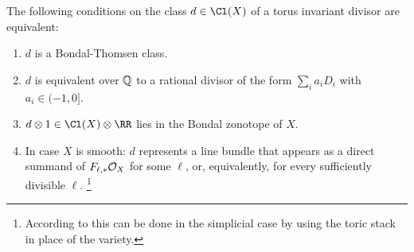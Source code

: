 \documentclass{amsart}
\begin{document}
\begin{thm}\label{thm:Bondal-Thomsen equivalences}
    The following conditions on the class $d\in \Cl(X)$ of a torus invariant divisor  are equivalent:
    \begin{enumerate}
        \item  $d$ is a Bondal-Thomsen class.
        \item  $d$ is equivalent over $\mathbb Q$ to a rational divisor of the form $\sum_{i} a_i D_i$ with $a_i \in (-1,0].$
        \item  $d\otimes 1 \in \Cl(X) \otimes \RR$  lies in the Bondal zonotope of $X$.
        \item  In case $X$ is smooth: $d$ represents a line bundle that appears as a direct summand of
        $F_{\ell,*}{\mathcal O}_X$ for some $\ell$, or, equivalently, for every sufficiently divisible $\ell$. 
        \footnote{According to \cite[Remark 5.4]{HHL24} this can be done in the simplicial case
        by using the toric stack in place of the variety.}
     \end{enumerate}
\end{thm}
\end{document}
